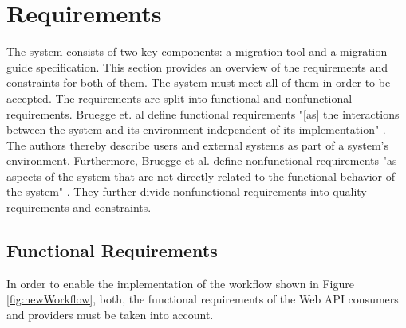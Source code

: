 \section{Requirements}
\label{sec:Requirements}

The system consists of two key components: a migration tool and a migration guide specification. This section provides an overview of the requirements and constraints for both of them. The system must meet all of them in order to be accepted. The requirements are split into functional and nonfunctional requirements. Bruegge et. al define functional requirements "[as] the interactions between the system and its environment independent of its implementation" \cite{bruegge_object-oriented_2010}. The authors thereby describe users and external systems as part of a system's environment. Furthermore, Bruegge et al. define nonfunctional requirements "as aspects of the system that are not directly related to the functional behavior of the system" \cite{bruegge_object-oriented_2010}. They further divide nonfunctional requirements into quality requirements and constraints. 

\subsection{Functional Requirements}
\label{subsec:FunctionalRequirements}
 
 In order to enable the implementation of the workflow shown in Figure \ref{fig:newWorkflow}, both, the functional requirements of the Web API consumers and providers must be taken into account. 

